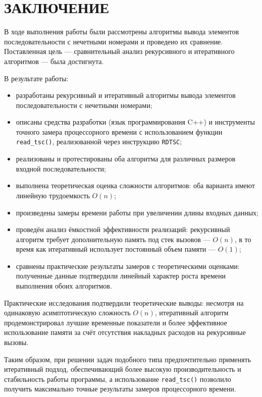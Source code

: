 \chapter*{ЗАКЛЮЧЕНИЕ}

В ходе выполнения работы были рассмотрены алгоритмы вывода элементов последовательности с нечетными номерами и проведено их сравнение. Поставленная цель — сравнительный анализ рекурсивного и итеративного алгоритмов — была достигнута.

В результате работы:
\begin{itemize}
	\item разработаны рекурсивный и итеративный алгоритмы вывода элементов последовательности с нечетными номерами;
	\item описаны средства разработки (язык программирования C++) и инструменты точного замера процессорного времени с использованием функции \texttt{read\_tsc()}, реализованной через инструкцию \texttt{RDTSC};
	\item реализованы и протестированы оба алгоритма для различных размеров входной последовательности;
	\item выполнена теоретическая оценка сложности алгоритмов: оба варианта имеют линейную трудоемкость $O(n)$;
	\item произведены замеры времени работы при увеличении длины входных данных;
	\item проведён анализ ёмкостной эффективности реализаций: рекурсивный алгоритм требует дополнительную память под стек вызовов — $O(n)$, в то время как итеративный использует постоянный объем памяти — $O(1)$;
	\item сравнены практические результаты замеров с теоретическими оценками: полученные данные подтвердили линейный характер роста времени выполнения обоих алгоритмов.
\end{itemize}

Практические исследования подтвердили теоретические выводы: несмотря на одинаковую асимптотическую сложность $O(n)$, итеративный алгоритм продемонстрировал лучшие временные показатели и более эффективное использование памяти за счёт отсутствия накладных расходов на рекурсивные вызовы. 

Таким образом, при решении задач подобного типа предпочтительно применять итеративный подход, обеспечивающий более высокую производительность и стабильность работы программы, а использование \texttt{read\_tsc()} позволило получить максимально точные результаты замеров процессорного времени.
